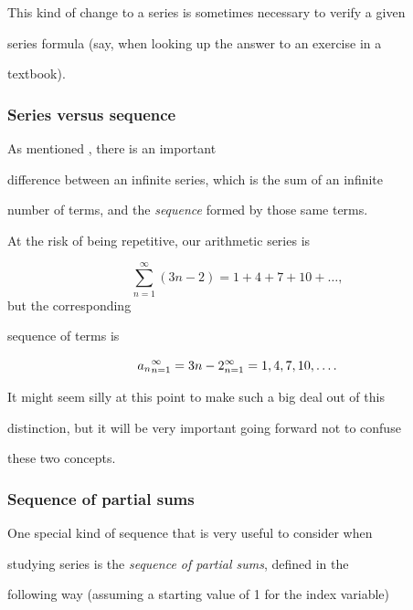 This kind of change to a series is sometimes necessary to verify a given

series formula (say, when looking up the answer to an exercise in a

textbook).


\subsubsection{Series versus sequence}
\label{sss:seri-1648}


As mentioned \href{above}, there is an important

difference between an infinite series, which is the sum of an infinite

number of terms, and the \textit{sequence} formed by those same terms.


At the risk of being repetitive, our arithmetic series is


\[
\sum _{n=1}^{\infty} (3n-2) = 1+4+7+10+\ldots,
\] but the corresponding

sequence of terms is


\[
\\{a_n\\} _{n=1}^{\infty} = \\{3n-2\\} _{n=1}^{\infty} = 1,4,7,10,\ldots.
\]

It might seem silly at this point to make such a big deal out of this

distinction, but it will be very important going forward not to confuse

these two concepts.


\subsubsection{Sequence of partial sums}
\label{sss:sequ-97ba}


One special kind of sequence that is very useful to consider when

studying series is the \textit{sequence of partial sums}, defined in the

following way (assuming a starting value of 1 for the index variable)

